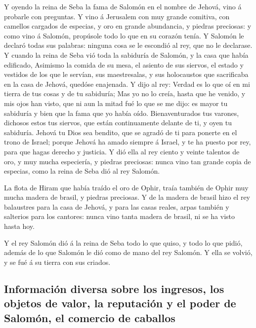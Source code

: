  Y oyendo la reina de Seba la fama de Salomón en el nombre
de Jehová, vino á probarle con preguntas.  Y vino á
Jerusalem con muy grande comitiva, con camellos cargados de especias, y
oro en grande abundancia, y piedras preciosas: y como vino á Salomón,
propúsole todo lo que en su corazón tenía.  Y Salomón le
declaró todas sus palabras: ninguna cosa se le escondió al rey, que no
le declarase.  Y cuando la reina de Seba vió toda la
sabiduría de Salomón, y la casa que había edificado, 
Asimismo la comida de su mesa, el asiento de sus siervos, el estado y
vestidos de los que le servían, sus maestresalas, y sus holocaustos que
sacrificaba en la casa de Jehová, quedóse enajenada.  Y
dijo al rey: Verdad es lo que oí en mi tierra de tus cosas y de tu
sabiduría;  Mas yo no lo creía, hasta que he venido, y mis
ojos han visto, que ni aun la mitad fué lo que se me dijo: es mayor tu
sabiduría y bien que la fama que yo había oído. 
Bienaventurados tus varones, dichosos estos tus siervos, que están
continuamente delante de ti, y oyen tu sabiduría.  Jehová
tu Dios sea bendito, que se agradó de ti para ponerte en el trono de
Israel; porque Jehová ha amado siempre á Israel, y te ha puesto por rey,
para que hagas derecho y justicia.  Y dió ella al rey
ciento y veinte talentos de oro, y muy mucha especiería, y piedras
preciosas: nunca vino tan grande copia de especias, como la reina de
Seba dió al rey Salomón.

 La flota de Hiram que había traído el oro de Ophir,
traía también de Ophir muy mucha madera de brasil, y piedras preciosas.
 Y de la madera de brasil hizo el rey balaustres para la
casa de Jehová, y para las casas reales, arpas también y salterios para
los cantores: nunca vino tanta madera de brasil, ni se ha visto hasta
hoy.

 Y el rey Salomón dió á la reina de Seba todo lo que
quiso, y todo lo que pidió, además de lo que Salomón le dió como de mano
del rey Salomón. Y ella se volvió, y se fué á su tierra con sus criados.

\hypertarget{informaciuxf3n-diversa-sobre-los-ingresos-los-objetos-de-valor-la-reputaciuxf3n-y-el-poder-de-salomuxf3n-el-comercio-de-caballos}{%
\subsection{Información diversa sobre los ingresos, los objetos de
valor, la reputación y el poder de Salomón, el comercio de
caballos}\label{informaciuxf3n-diversa-sobre-los-ingresos-los-objetos-de-valor-la-reputaciuxf3n-y-el-poder-de-salomuxf3n-el-comercio-de-caballos}}

